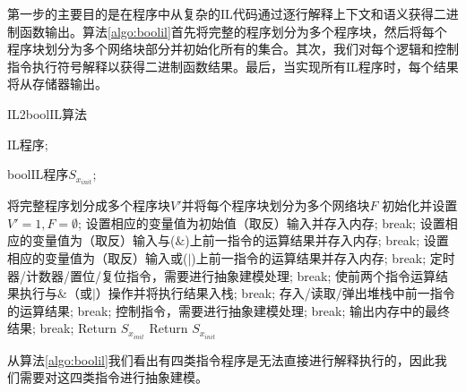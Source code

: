 第一步的主要目的是在程序中从复杂的IL代码通过逐行解释上下文和语义获得二进制函数输出。算法\ref{algo:boolil}首先将完整的程序划分为多个程序块，然后将每个程序块划分为多个网络块部分并初始化所有的集合。其次，我们对每个逻辑和控制指令执行符号解释以获得二进制函数结果。最后，当实现所有IL程序时，每个结果将从存储器输出。

\begin{algorithm}[!htb]
\caption{IL2boolIL算法}
\label{algo:boolil}
\begin{algorithmic}[1]
\Require %
IL程序;

\Ensure %
boolIL程序$S_{x_{init}}$;  

\State 将完整程序划分成多个程序块$V'$并将每个程序块划分为多个网络块$F$
\State 初始化并设置$V'= 1,F=\emptyset$;
\State 设置相应的变量值为初始值（取反）输入并存入内存; break;
\EndCase
{}
\State 设置相应的变量值为（取反）输入与($\&$)上前一指令的运算结果并存入内存; break;
\EndCase
{}
\State 设置相应的变量值为（取反）输入或($|$)上前一指令的运算结果并存入内存; break;
\EndCase
{}
\State 定时器/计数器/置位/复位指令，需要进行抽象建模处理; break;
\EndCase
\EndSwitch
\EndFor
\EndCase
{}
\State 使前两个指令运算结果执行与$\&$（或$|$）操作并将执行结果入栈; break;
\EndCase
{}
\State 存入/读取/弹出堆栈中前一指令的运算结果; break;
\EndCase
{}
\State 控制指令，需要进行抽象建模处理; break;
\EndCase
\Case {$=$}
\State 输出内存中的最终结果; break;
\EndCase
\Default
\State Return $S_{x_{init}}$
\EndDefault
\EndSwitch
\EndFor
\State Return $S_{x_{init}}$
\end{algorithmic}
\end{algorithm}

从算法\ref{algo:boolil}我们看出有四类指令程序是无法直接进行解释执行的，因此我们需要对这四类指令进行抽象建模。

